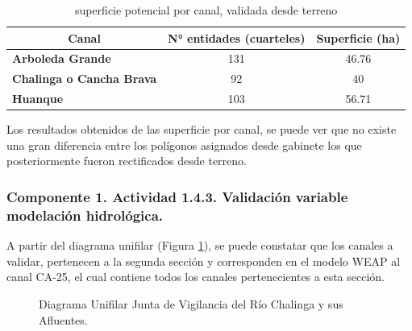 \documentclass[]{article}
\begin{document}
\begin{table}[H]
\centering
\caption{superficie potencial por canal, validada desde terreno}
\label{my-label}
\begin{tabular}{|l|c|c|}
\hline
\multicolumn{1}{|c|}{\textbf{Canal}} & \textbf{N° entidades (cuarteles)} & \textbf{Superficie (ha)} \\ \hline
\textbf{Arboleda Grande}             & 131                               & 46.76                    \\ \hline
\textbf{Chalinga o Cancha Brava}     & 92                                & 40                       \\ \hline
\textbf{Huanque}                     & 103                               & 56.71                    \\ \hline
\end{tabular}
\end{table}

Los resultados obtenidos de las superficie por canal, se puede ver que no existe una gran diferencia entre los polígonos asignados desde gabinete los que posteriormente fueron rectificados desde terreno.

\subsubsection{Componente 1. Actividad 1.4.3. Validación variable modelación hidrológica.}


A partir del diagrama unifilar (Figura \ref{etiqueta_figura8}), se puede constatar que los canales a validar, pertenecen a la segunda sección y corresponden en el modelo WEAP al canal CA-25, el cual contiene todos los canales pertenecientes a esta sección.

\begin{figure}[H]
\begin{center}
\caption{Diagrama Unifilar Junta de Vigilancia del Río Chalinga y sus Afluentes.}
\label{etiqueta_figura8}
\end{center}
\end{figure}
\end{document}
